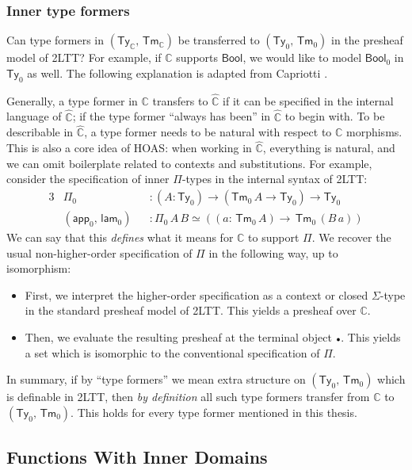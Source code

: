 \documentclass[12pt,a4paper,twoside,openany]{book}
\theoremstyle{remark}
\theoremstyle{definition}
\theoremstyle{theorem}
\newcommand{\ms}[1]{\mathsf{#1}}
\newcommand{\mbb}[1]{\mathbb{#1}}
\newcommand{\Tm}{\mathsf{Tm}}
\newcommand{\Ty}{\mathsf{Ty}}
\newcommand{\emptycon}{\scaleobj{.75}\bullet}
\newcommand{\app}{\ms{app}}
\newcommand{\Bool}{\ms{Bool}}
\newcommand{\mbbC}{\mbb{C}}
\newcommand{\hmbbC}{\hat{\mbb{C}}}
\newcommand{\lam}{\ms{lam}}
\begin{document}
\subsubsection{Inner type formers}

Can type formers in $(\Ty_{\mbbC},\,\Tm_{\mbbC})$ be transferred to
$(\Ty_0,\,\Tm_0)$ in the presheaf model of 2LTT? For example, if $\mbbC$
supports $\Bool$, we would like to model $\Bool_0$ in $\Ty_0$ as well. The
following explanation is adapted from Capriotti \cite[Section
  2.3]{capriotti2017models}.

Generally, a type former in $\mbbC$ transfers to $\hmbbC$ if it can be specified
in the internal language of $\hmbbC$; if the type former ``always has been'' in
$\hmbbC$ to begin with. To be describable in $\hmbbC$, a type former needs to be
natural with respect to $\mbbC$ morphisms. This is also a core idea of HOAS:
when working in $\hmbbC$, everything is natural, and we can omit boilerplate
related to contexts and substitutions. For example, consider the specification
of inner $\Pi$-types in the internal syntax of 2LTT:
\begin{alignat*}{3}
  &\Pi_0             &&: (A : \Ty_0) \to (\Tm_0\,A \to \Ty_0) \to \Ty_0\\
  &(\app_0,\,\lam_0) &&: \Pi_0\,A\,B \simeq ((a :\,\Tm_0\,A) \to \,\Tm_0\,(B\,a))
\end{alignat*}
We can say that this \emph{defines} what it means for $\mbbC$ to support
$\Pi$. We recover the usual non-higher-order specification of $\Pi$ in the
following way, up to isomorphism:
\begin{itemize}
\item First, we interpret the higher-order specification as a context or closed $\Sigma$-type
      in the standard presheaf model of 2LTT. This yields a presheaf over $\mbbC$.
\item Then, we evaluate the resulting presheaf at the terminal object
      $\emptycon$. This yields a set which is isomorphic to the conventional
      specification of $\Pi$.
\end{itemize}

In summary, if by ``type formers'' we mean extra structure on $(\Ty_0,\,\Tm_0)$
which is definable in 2LTT, then \emph{by definition} all such type formers
transfer from $\mbbC$ to $(\Ty_0,\,\Tm_0)$. This holds for every type former
mentioned in this thesis.

\subsection{Functions With Inner Domains}
\end{document}
